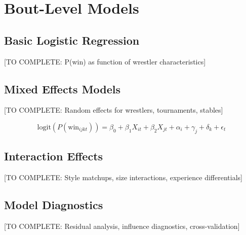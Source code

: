 \section{Bout-Level Models}

\subsection{Basic Logistic Regression}

[TO COMPLETE: P(win) as function of wrestler characteristics]

\subsection{Mixed Effects Models}

[TO COMPLETE: Random effects for wrestlers, tournaments, stables]

\begin{equation}
\text{logit}(P(\text{win}_{ijkt})) = \beta_0 + \beta_1 X_{it} + \beta_2 X_{jt} + \alpha_i + \gamma_j + \delta_k + \epsilon_t
\end{equation}

\subsection{Interaction Effects}

[TO COMPLETE: Style matchups, size interactions, experience differentials]

\subsection{Model Diagnostics}

[TO COMPLETE: Residual analysis, influence diagnostics, cross-validation]